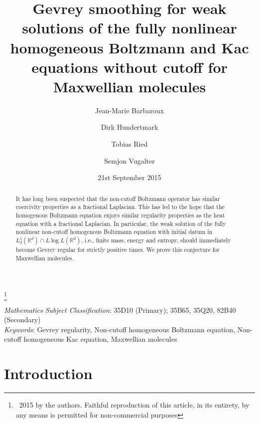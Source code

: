 \documentclass[11pt,a4paper,reqno]{amsart}
\theoremstyle{plain}
\theoremstyle{definition}
\begin{document}
\title[Gevrey smoothing for the homogeneous non-cutoff Boltzmann equation]{Gevrey smoothing for weak solutions of the fully nonlinear homogeneous Boltzmann and Kac equations without cutoff for Maxwellian molecules}
\author{Jean-Marie Barbaroux}
\author{Dirk Hundertmark}
\author{Tobias Ried}
\author{Semjon Vugalter}
\date{21st September 2015}
\thanks{\textcopyright~2015 by the authors. Faithful reproduction of this article,
        in its entirety, by any means is permitted for non-commercial purposes}
	\begin{abstract}
	  It has long been suspected that the non-cutoff Boltzmann operator has similar coercivity properties as a fractional Laplacian. This has led to the hope that the homogenous Boltzmann equation enjoys similar regularity properties as the heat equation with a fractional Laplacian.
	   In particular, the weak solution of the fully nonlinear non-cutoff homogenous Boltzmann equation with initial datum in $L^1_2(\mathbb{R}^d)\cap L\log L(\mathbb{R}^d)$, i.e., finite mass, energy and entropy, should immediately become Gevrey regular for strictly positive times. We prove this conjecture for Maxwellian molecules. 
	\end{abstract}
\maketitle
{ \textit{Mathematics Subject Classification}: 35D10 (Primary); 
 35B65, 35Q20, 82B40 (Secondary) \\ 
\textit{Keywords}: Gevrey regularity, Non-cutoff homogeneous Boltzmann equation, Non-cutoff homogeneous Kac equation, Maxwellian molecules
}
{\hypersetup{linkcolor=black}
\tableofcontents}
\section{Introduction}\label{sec:introduction}
\end{document}
